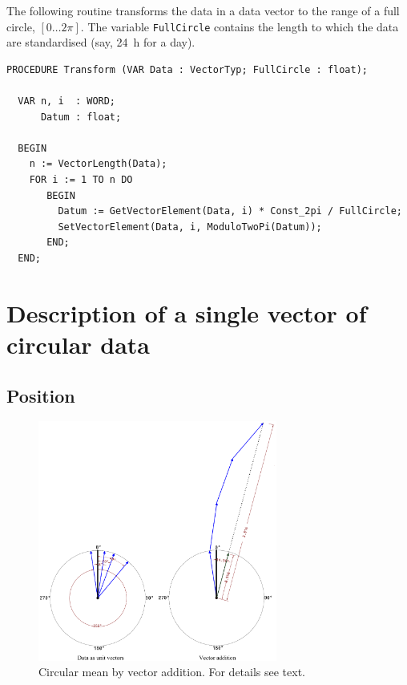 \begin{refsection}
The following routine transforms the data in a data vector to the range of a full circle, \( [0\ldots 2\pi] \). The variable \texttt{FullCircle} contains the length to which the data are standardised (say, \SI{24}{h} for a day).

\begin{lstlisting}[caption=Transformation to 0..2\textpi]
  PROCEDURE Transform (VAR Data : VectorTyp; FullCircle : float);

  VAR n, i  : WORD;
      Datum : float;

  BEGIN
    n := VectorLength(Data);
    FOR i := 1 TO n DO
       BEGIN
         Datum := GetVectorElement(Data, i) * Const_2pi / FullCircle;
         SetVectorElement(Data, i, ModuloTwoPi(Datum));
       END;
  END;
\end{lstlisting}

\section{Description of a single vector of circular data}

\subsection{Position}

\begin{figure}
 \caption{Circular mean by vector addition. For details see text. }
 \label{fig:CircMean}
 \centering
 \includegraphics[width=0.7\textwidth]{Graphics/CircularMean}
\end{figure}



\end{refsection}
